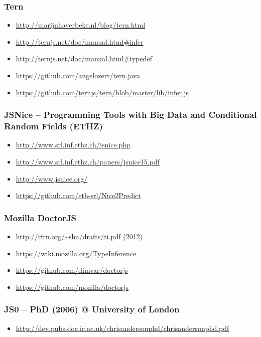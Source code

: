 \subsubsection{Tern}
\begin{itemize}
 \item \url{http://marijnhaverbeke.nl/blog/tern.html}
 \item \url{http://ternjs.net/doc/manual.html#infer}
 \item \url{http://ternjs.net/doc/manual.html#typedef}
 \item \url{https://github.com/angelozerr/tern.java}
 \item \url{https://github.com/ternjs/tern/blob/master/lib/infer.js}
\end{itemize}

\subsubsection{JSNice -- Programming Tools with Big Data and Conditional Random Fields (ETHZ)}
\begin{itemize}
 \item \url{http://www.srl.inf.ethz.ch/jsnice.php}
 \item \url{http://www.srl.inf.ethz.ch/papers/jsnice15.pdf}
 \item \url{http://www.jsnice.org/}
 \item \url{https://github.com/eth-srl/Nice2Predict}
\end{itemize}

\subsubsection{Mozilla DoctorJS}
\begin{itemize}
\item \url{http://rfrn.org/~shu/drafts/ti.pdf} (2012)
\item \url{https://wiki.mozilla.org/TypeInference}
\item \url{https://github.com/dimvar/doctorjs}
\item \url{https://github.com/mozilla/doctorjs}
\end{itemize}

\subsubsection{JS0 -- PhD (2006) @ University of London}
\begin{itemize}
 \item \url{http://dev.pubs.doc.ic.ac.uk/chrisandersonphd/chrisandersonphd.pdf}
\end{itemize}

